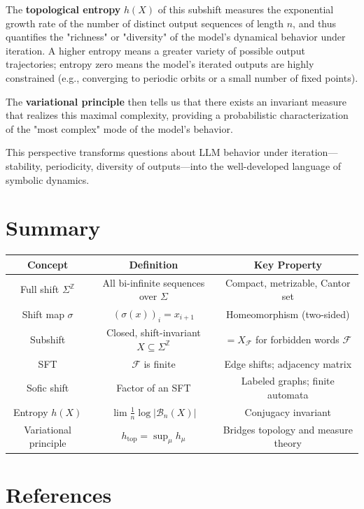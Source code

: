 The \textbf{topological entropy} $h(X)$ of this subshift measures the exponential growth rate of the number of distinct output sequences of length $n$, and thus quantifies the "richness" or "diversity" of the model's dynamical behavior under iteration. A higher entropy means a greater variety of possible output trajectories; entropy zero means the model's iterated outputs are highly constrained (e.g., converging to periodic orbits or a small number of fixed points).

The \textbf{variational principle} then tells us that there exists an invariant measure that realizes this maximal complexity, providing a probabilistic characterization of the "most complex" mode of the model's behavior.

This perspective transforms questions about LLM behavior under iteration---stability, periodicity, diversity of outputs---into the well-developed language of symbolic dynamics.



\section{Summary}

\begin{center}
\begin{tabular}{ccc}
\toprule
Concept & Definition & Key Property \\
\midrule
Full shift $\Sigma^{\mathbb{Z}}$ & All bi-infinite sequences over $\Sigma$ & Compact, metrizable, Cantor set \\
Shift map $\sigma$ & $(\sigma(x))_i = x_{i+1}$ & Homeomorphism (two-sided) \\
Subshift & Closed, shift-invariant $X \subseteq \Sigma^{\mathbb{Z}}$ & $= X_{\mathcal{F}}$ for forbidden words $\mathcal{F}$ \\
SFT & $\mathcal{F}$ is finite & Edge shifts; adjacency matrix \\
Sofic shift & Factor of an SFT & Labeled graphs; finite automata \\
Entropy $h(X)$ & $\lim \frac{1}{n} \log |\mathcal{B}_n(X)|$ & Conjugacy invariant \\
Variational principle & $h_{\mathrm{top}} = \sup_\mu h_\mu$ & Bridges topology and measure theory \\
\bottomrule
\end{tabular}
\end{center}



\section{References}

